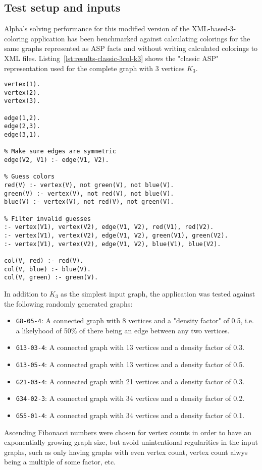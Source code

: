 \subsection{Test setup and inputs}

Alpha's solving performance for this modified version of the XML-based-3-coloring application has been benchmarked against calculating colorings for the same graphs represented as ASP facts and without writing calculated colorings to XML files.
Listing~\ref{lst:results-classic-3col-k3} shows the "classic ASP" representation used for the complete graph with 3 vertices $K_3$.

\begin{lstlisting}[style=asp-code, label={lst:results-classic-3col-k3}, caption={Pure-ASP version of a 3-coloring encoding for the graph $K_3$.}]
vertex(1).
vertex(2).
vertex(3).

edge(1,2).
edge(2,3).
edge(3,1).  

% Make sure edges are symmetric
edge(V2, V1) :- edge(V1, V2).

% Guess colors
red(V) :- vertex(V), not green(V), not blue(V).
green(V) :- vertex(V), not red(V), not blue(V).
blue(V) :- vertex(V), not red(V), not green(V).

% Filter invalid guesses
:- vertex(V1), vertex(V2), edge(V1, V2), red(V1), red(V2).
:- vertex(V1), vertex(V2), edge(V1, V2), green(V1), green(V2).
:- vertex(V1), vertex(V2), edge(V1, V2), blue(V1), blue(V2).

col(V, red) :- red(V).
col(V, blue) :- blue(V).
col(V, green) :- green(V).    
\end{lstlisting}

In addition to $K_3$ as the simplest input graph, the application was tested against the following randomly generated graphs:
\begin{itemize}
    \item \texttt{G8-05-4}: A connected graph with 8 vertices and a "density factor" of 0.5, i.e. a likelyhood of 50\% of there being an edge between any two vertices.
    \item \texttt{G13-03-4}: A connected graph with 13 vertices and a density factor of 0.3.
    \item \texttt{G13-05-4}: A connected graph with 13 vertices and a density factor of 0.5.
    \item \texttt{G21-03-4}: A connected graph with 21 vertices and a density factor of 0.3.
    \item \texttt{G34-02-3}: A connected graph with 34 vertices and a density factor of 0.2.
    \item \texttt{G55-01-4}: A connected graph with 34 vertices and a density factor of 0.1.
\end{itemize}
Ascending Fibonacci numbers were chosen for vertex counts in order to have an exponentially growing graph size, but avoid unintentional regularities in the input graphs, such as only having graphs with even vertex count, vertex count alwys being a multiple of some factor, etc.    

